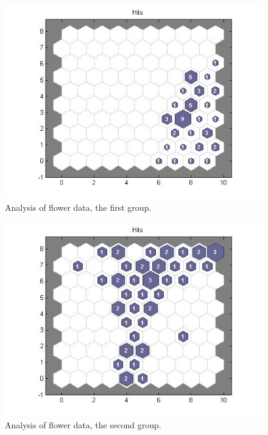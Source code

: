 \documentclass[a4paper]{article}
\begin{document}
 \begin{figure}[H] %
	 \includegraphics[scale=0.5]{q4_plotsom1_50.jpg}
	 \caption{\label{fig:plotg1} Analysis of flower data, the first group.}
 \end{figure}
  \begin{figure}[H] %
	 \includegraphics[scale=0.5]{q4_plotsom50_100.jpg}
	 \caption{\label{fig:plotg2} Analysis of flower data, the second group.}
 \end{figure}
\end{document}
